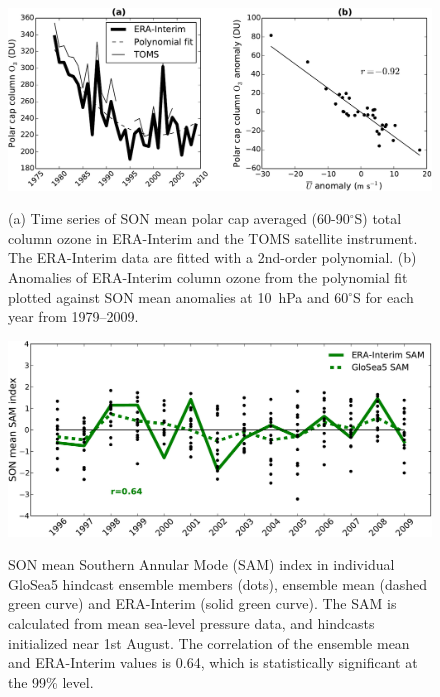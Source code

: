 \begin{figure}[t]
  \noindent\includegraphics[width=\textwidth,angle=0]{figures/GloSea5/zmzw_ozone_scatter_crop.pdf}\\
  \caption[Relation between stratospheric polar vortex strenth and column ozone.]{(a) Time series of SON mean polar cap averaged (60-90$^{\circ}$S) total column ozone in ERA-Interim and the TOMS satellite instrument. The ERA-Interim data are fitted with a 2nd-order polynomial. (b) Anomalies of ERA-Interim column ozone from the polynomial fit plotted against SON mean anomalies at 10~hPa and 60$^{\circ}$S for each year from 1979--2009.}\label{Fig4}
\end{figure}

\begin{figure}[t]
  \noindent\includegraphics[width=\textwidth,angle=0]{figures/GloSea5/sam_crop.pdf}\\
  \caption[GloSea5 predictions of the SAM.]{SON mean Southern Annular Mode (SAM) index in individual GloSea5 hindcast ensemble members (dots), ensemble mean (dashed green curve) and ERA-Interim (solid green curve). The SAM is calculated from mean sea-level pressure data, and hindcasts initialized near 1st August. The correlation of the ensemble mean and ERA-Interim values is 0.64, which is statistically significant at the 99\% level.}\label{Fig5}
\end{figure}


